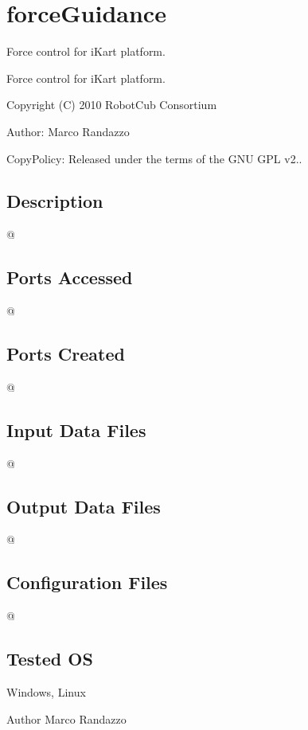 \section{force\+Guidance}
\label{group__foceGuidance}


Force control for i\+Kart platform.  


Force control for i\+Kart platform. 

Copyright (C) 2010 Robot\+Cub Consortium

Author\+: Marco Randazzo

Copy\+Policy\+: Released under the terms of the G\+N\+U G\+P\+L v2..\hypertarget{group__laserScannerGui_intro_sec}{}\subsection{Description}\label{group__laserScannerGui_intro_sec}
@\hypertarget{group__laserScannerGui_portsa_sec}{}\subsection{Ports Accessed}\label{group__laserScannerGui_portsa_sec}
@\hypertarget{group__laserScannerGui_portsc_sec}{}\subsection{Ports Created}\label{group__laserScannerGui_portsc_sec}
@\hypertarget{group__laserScannerGui_in_files_sec}{}\subsection{Input Data Files}\label{group__laserScannerGui_in_files_sec}
@\hypertarget{group__laserScannerGui_out_data_sec}{}\subsection{Output Data Files}\label{group__laserScannerGui_out_data_sec}
@\hypertarget{group__laserScannerGui_conf_file_sec}{}\subsection{Configuration Files}\label{group__laserScannerGui_conf_file_sec}
@\hypertarget{group__laserScannerGui_tested_os_sec}{}\subsection{Tested O\+S}\label{group__laserScannerGui_tested_os_sec}
Windows, Linux

\begin{DoxyAuthor}{Author}
Marco Randazzo 
\end{DoxyAuthor}
